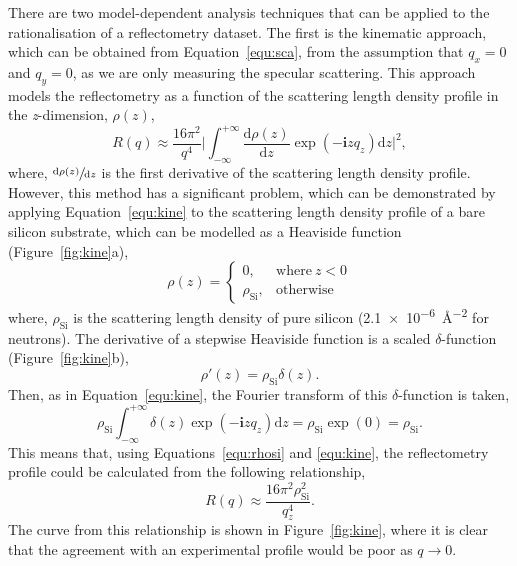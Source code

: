 There are two model-dependent analysis techniques that can be applied to the rationalisation of a reflectometry dataset.
The first is the kinematic approach, which can be obtained from Equation~\ref{equ:sca}, from the assumption that $q_x = 0$ and $q_y = 0$, as we are only measuring the specular scattering.
This approach models the reflectometry as a function of the scattering length density profile in the \emph{z}-dimension, $\rho(z)$,
%
\begin{equation}
    R(q) \approx \frac{16\pi^2}{q^4}\bigg|\int_{-\infty}^{+\infty}\frac{\text{d}\rho(z)}{\text{d}z}\exp{(-\mathbf{i}zq_z)}\text{d}z\bigg|^2,
    \label{equ:kine}
\end{equation}
%
where, $\sfrac{\text{d}\rho(z)}{\text{d}z}$ is the first derivative of the scattering length density profile.
However, this method has a significant problem, which can be demonstrated by applying Equation~\ref{equ:kine} to the scattering length density profile of a bare silicon substrate, which can be modelled as a Heaviside function (Figure~\ref{fig:kine}a),
%
\begin{equation}
    \rho(z) =
  \begin{cases}
    0, & \text{where}\ z < 0 \\
    \rho_{\text{Si}}, & \text{otherwise}
  \end{cases}
\end{equation}
%
where, $\rho_{\text{Si}}$ is the scattering length density of pure silicon (\SI{2.1e-6}{\angstrom^{-2}} for neutrons).
The derivative of a stepwise Heaviside function is a scaled $\delta$-function (Figure~\ref{fig:kine}b),
%
\begin{equation}
    \rho'(z) = \rho_{\text{Si}}\delta(z).
\end{equation}
%
Then, as in Equation~\ref{equ:kine}, the Fourier transform of this $\delta$-function is taken,
%
\begin{equation}
    \rho_{\text{Si}}\int_{-\infty}^{+\infty}\delta(z)\exp{(-\mathbf{i}zq_z)}\text{d}z = \rho_{\text{Si}}\exp(0) = \rho_{\text{Si}}.
    \label{equ:rhosi}
\end{equation}
%
This means that, using Equations~\ref{equ:rhosi} and \ref{equ:kine}, the reflectometry profile could be calculated from the following relationship,
%
\begin{equation}
    R(q)\approx \frac{16\pi^2\rho_{\text{Si}}^2}{q_z^4}.
\end{equation}
%
The curve from this relationship is shown in Figure~\ref{fig:kine}, where it is clear that the agreement with an experimental profile would be poor as $q \rightarrow 0$.

